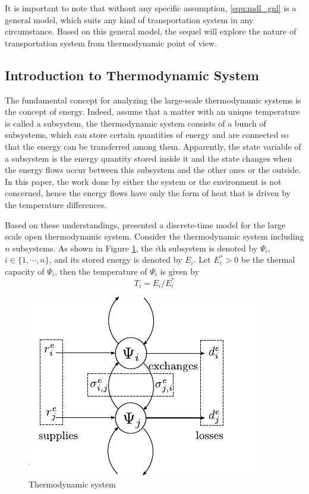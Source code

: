 \documentclass[preprint,authoryear,12pt]{elsarticle}
\begin{document}
It is important to note that without any specific assumption, \eqref{equ:mdl_gnl} is a general model, which suits any kind of transportation system in any circumstance. Based on this general model, the sequel will explore the nature of transportation system from thermodynamic point of view.

\subsection{Introduction to Thermodynamic System}

The fundamental concept for analyzing the large-scale thermodynamic
systems is the concept of energy. Indeed, assume that a matter with
an unique temperature is called a subsystem, the thermodynamic system
consists of a bunch of subsystems, which can store certain quantities
of energy and are connected so that the energy can be transferred
among them. Apparently, the state variable of a subsystem is the
energy quantity stored inside it and the state changes when the
energy flows occur between this subsystem and the other ones or the
outside. In this paper, the work done by either the system or the
environment is not concerned, hence the energy flows have only the
form of heat that is driven by the temperature differences.

Based on these understandings, \citet{haddad_thermodynamic_2005}
presented a discrete-time model for the large scale open
thermodynamic system. Consider the thermodynamic system including $n$
subsystems. As shown in Figure \ref{fig:Ther_Sys}, the $i$th
subsystem is denoted by $\Psi_i$, $i\in \{1,\cdots,n\}$, and its
stored energy is denoted by $E_i$. Let $E_i^*>0$ be the thermal
capacity of $\Psi_i$, then the temperature of $\Psi_i$ is given by
\begin{equation}\label{equ:temperature}
    T_i= {E_i}/{E^*_i}
\end{equation}

\begin{figure}[ht]
  \centering
  \includegraphics{pics/HModel}
  \caption{Thermodynamic system}
  \label{fig:Ther_Sys}
\end{figure}
\end{document}
